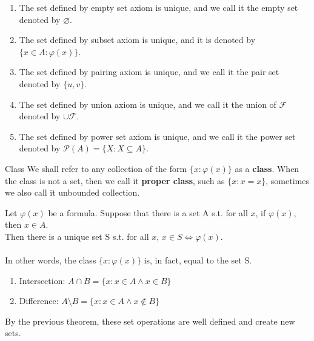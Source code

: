 \begin{remark}
    \begin{enumerate}
        \item The set defined by empty set axiom is unique, and we call it the empty set denoted by $\varnothing$.\\
        \item The set defined by subset axiom is unique, and it is denoted by $\{x \in A:\varphi(x)\}$.\\
        \item The set defined by pairing axiom is unique, and we call it the pair set denoted by $\{u, v\}$.\\
        \item The set defined by union axiom is unique, and we call it the union of $\mathcal{F}$ denoted by $\cup \mathcal{F}$.\\
        \item The set defined by power set axiom is unique, and we call it the power set denoted by 
        $\mathcal{P}(A) = \{X:X \subseteq A\}.$
    \end{enumerate}
\end{remark}

\begin{definition}{Class}{}
    We shall refer to any collection of the form $\{x:\varphi(x)\}$ as a \textbf{class}. When the class is not a set, then we call it \textbf{proper class}, such as $\{x:x=x\}$, sometimes we also call it unbounded collection.
\end{definition}

\begin{theorem}{}{}
    Let $\varphi(x)$ be a formula. Suppose that there is a set A s.t. for all $x$, if $\varphi(x)$, then $x \in A$.\\
    Then there is a unique set S s.t. for all $x$, $x \in S \iff \varphi(x)$. \\
    \\
    In other words, the class $\{x:\varphi(x)\}$ is, in fact, equal to the set S.
\end{theorem}

\begin{corollary}{}{}
    \begin{enumerate}
        \item Intersection: $A \cap B = \{x:x \in A \land x \in B\}$\\
        \item Difference: $A \setminus B = \{x:x \in A \land x \notin B\}$ \\
    \end{enumerate}
    By the previous theorem, these set operations are well defined and create new sets.
\end{corollary}
